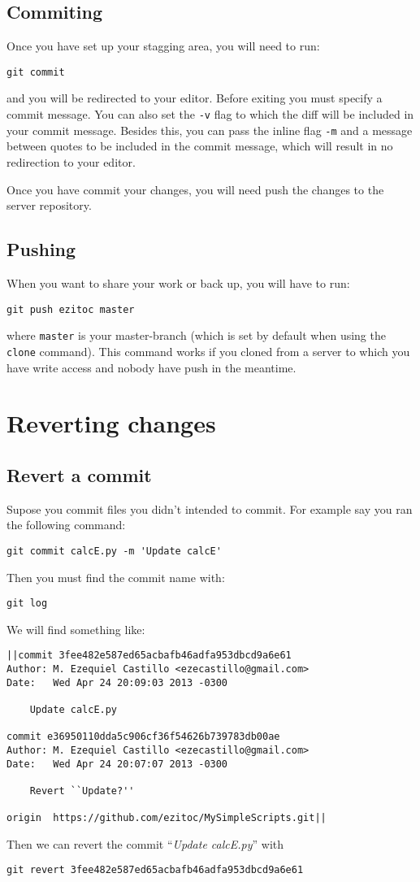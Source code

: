 \documentclass[a4paper,12pt]{article}
\begin{document}
\subsection{Commiting}
Once you have set up your stagging area, you will need to run:
\begin{lstlisting}[style=input]
git commit
\end{lstlisting}
and you will be redirected to your editor. Before exiting you must specify a
commit message. You can also set the \texttt{-v} flag to which the diff will
be included in your commit message. Besides this, you can pass the inline flag
\texttt{-m} and a message between quotes to be included in the commit message,
which will result in no redirection to your editor.

Once you have commit your changes, you will need push the changes to the
server repository. 

\subsection{Pushing}
When you want to share your work or back up, you will have to run:
\begin{lstlisting}[style=input]
git push ezitoc master
\end{lstlisting}
where \texttt{master} is your master-branch (which is set by default when
using the \texttt{clone} command). This command works if you cloned from a
server to which you have write access and nobody have push in the meantime.


\section{Reverting changes}
\subsection{Revert a commit}
Supose you commit files you didn't intended to commit. For example say you ran
the following command:
\begin{lstlisting}[style=input]
git commit calcE.py -m 'Update calcE'
\end{lstlisting}
Then you must find the commit name with:
\begin{lstlisting}[style=input]
git log
\end{lstlisting}
We will find something like:
\begin{lstlisting}[style=output]
||commit 3fee482e587ed65acbafb46adfa953dbcd9a6e61
Author: M. Ezequiel Castillo <ezecastillo@gmail.com>
Date:   Wed Apr 24 20:09:03 2013 -0300

    Update calcE.py

commit e36950110dda5c906cf36f54626b739783db00ae
Author: M. Ezequiel Castillo <ezecastillo@gmail.com>
Date:   Wed Apr 24 20:07:07 2013 -0300

    Revert ``Update?''

origin  https://github.com/ezitoc/MySimpleScripts.git||
\end{lstlisting}

Then we can revert the commit ``\emph{Update calcE.py}'' with
\begin{lstlisting}[style=input]
git revert 3fee482e587ed65acbafb46adfa953dbcd9a6e61
\end{lstlisting}
\end{document}
